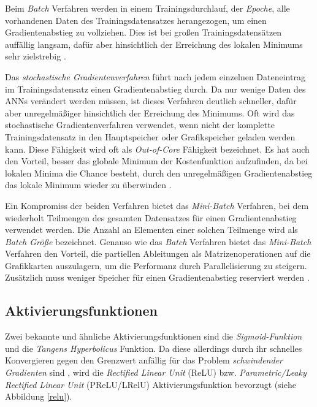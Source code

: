 Beim \textit{Batch} Verfahren werden in einem Trainingsdurchlauf, der \textit{Epoche}, alle vorhandenen Daten des Trainingsdatensatzes herangezogen, um einen Gradientenabstieg zu vollziehen. Dies ist bei großen Trainingsdatensätzen auffällig langsam, dafür aber hinsichtlich der Erreichung des lokalen Minimums sehr zielstrebig \cite{AurelienGeron.2018}.

Das \textit{stochastische Gradientenverfahren} führt nach jedem einzelnen Dateneintrag im Trainingsdatensatz einen Gradientenabstieg durch. Da nur wenige Daten des ANNs verändert werden müssen, ist dieses Verfahren deutlich schneller, dafür aber unregelmäßiger hinsichtlich der Erreichung des Minimums. Oft wird das stochastische Gradientenverfahren verwendet, wenn nicht der komplette Trainingsdatensatz in den Hauptspeicher oder Grafikspeicher geladen werden kann. Diese Fähigkeit wird oft als \textit{Out-of-Core} Fähigkeit bezeichnet. Es hat auch den Vorteil, besser das globale Minimum der Kostenfunktion aufzufinden, da bei lokalen Minima die Chance besteht, durch den unregelmäßigen Gradientenabstieg das lokale Minimum wieder zu überwinden \cite{AurelienGeron.2018}.

Ein Kompromiss der beiden Verfahren bietet das \textit{Mini-Batch} Verfahren, bei dem wiederholt Teilmengen des gesamten Datensatzes für einen Gradientenabstieg verwendet werden. Die Anzahl an Elementen einer solchen Teilmenge wird als \textit{Batch Größe} bezeichnet. Genauso wie das \textit{Batch} Verfahren bietet das \textit{Mini-Batch} Verfahren den Vorteil, die partiellen Ableitungen als Matrizenoperationen auf die Grafikkarten auszulagern, um die Performanz durch Parallelisierung zu steigern. Zusätzlich muss weniger Speicher für einen Gradientenabstieg reserviert werden \cite{AurelienGeron.2018}.

\subsection*{Aktivierungsfunktionen}

Zwei bekannte und ähnliche Aktivierungsfunktionen sind die \textit{Sigmoid-Funktion} und die \textit{Tangens Hyperbolicus} Funktion. Da diese allerdings durch ihr schnelles Konvergieren gegen den Grenzwert anfällig für das Problem \textit{schwindender Gradienten} sind \cite{AurelienGeron.2018}, wird die \textit{Rectified Linear Unit} (ReLU) bzw. \textit{Parametric/Leaky Rectified Linear Unit} (PReLU/LRelU) Aktivierungsfunktion bevorzugt (siehe Abbildung \ref{relu}). 

